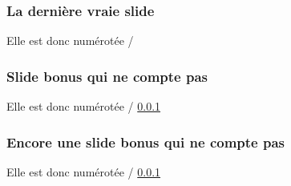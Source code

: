 \begin{frame}[fragile]
\frametitle{La dernière vraie slide\esp}
\label{derniere_slide_effective}
Elle est donc numérotée \theframenumber / \theframenumber
\end{frame}


\begin{frame}[fragile]
\frametitle{Slide bonus qui ne compte pas}
Elle est donc numérotée \theframenumber / \ref{derniere_slide_effective}
\end{frame}


\begin{frame}[fragile]
\frametitle{Encore une slide bonus qui ne compte pas}
Elle est donc numérotée \theframenumber / \ref{derniere_slide_effective}
\end{frame}
\addtocounter{framenumber}{-2} 


